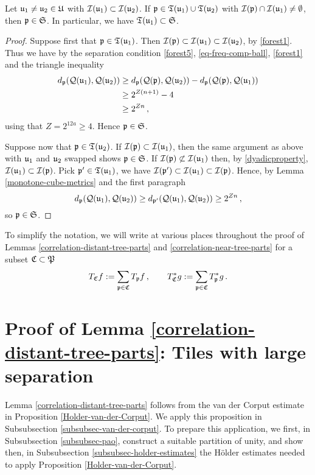 {\begin{lemma}
    \label{overlap-implies-distance}
    Let ${\mathfrak u}_1 \ne {\mathfrak u}_2 \in {\mathfrak U}$ with ${\mathcal{I}}({\mathfrak u}_1) \subset {\mathcal{I}}({\mathfrak u}_2)$. If ${\mathfrak p} \in {\mathfrak T}({\mathfrak u}_1) \cup {\mathfrak T}({\mathfrak u}_2)$ with ${\mathcal{I}}({\mathfrak p}) \cap {\mathcal{I}}({\mathfrak u}_1) \ne \emptyset$, then ${\mathfrak p} \in \mathfrak{S}$. In particular, we have ${\mathfrak T}({\mathfrak u}_1) \subset \mathfrak{S}$.
\end{lemma}

\begin{proof}
    Suppose first that ${\mathfrak p} \in {\mathfrak T}({\mathfrak u}_1)$. Then ${\mathcal{I}}({\mathfrak p}) \subset {\mathcal{I}}({\mathfrak u}_1) \subset {\mathcal{I}}({\mathfrak u}_2)$, by \eqref{forest1}. Thus we have by the separation condition \eqref{forest5}, \eqref{eq-freq-comp-ball}, \eqref{forest1} and the triangle inequality
    \begin{align*}
        d_{{\mathfrak p}}({\mathcal{Q}}({\mathfrak u}_1), {\mathcal{Q}}({\mathfrak u}_2)) &\ge d_{{\mathfrak p}}({\mathcal{Q}}({\mathfrak p}), {\mathcal{Q}}({\mathfrak u}_2)) - d_{{\mathfrak p}}({\mathcal{Q}}({\mathfrak p}), {\mathcal{Q}}({\mathfrak u}_1))\\
        &\ge 2^{Z(n+1)} - 4\\
        &\ge 2^{Zn}\,,
    \end{align*}
    using that $Z= 2^{12a}\ge 4$. Hence ${\mathfrak p} \in \mathfrak{S}$.

    Suppose now that ${\mathfrak p} \in {\mathfrak T}({\mathfrak u}_2)$. If ${\mathcal{I}}({\mathfrak p}) \subset {\mathcal{I}}({\mathfrak u}_1)$, then the same argument as above with ${\mathfrak u}_1$ and ${\mathfrak u}_2$ swapped shows ${\mathfrak p} \in \mathfrak{S}$. If ${\mathcal{I}}({\mathfrak p}) \not \subset {\mathcal{I}}({\mathfrak u}_1)$ then, by \eqref{dyadicproperty}, ${\mathcal{I}}({\mathfrak u}_1) \subset {\mathcal{I}}({\mathfrak p})$. Pick ${\mathfrak p}' \in {\mathfrak T}({\mathfrak u}_1)$, we have ${\mathcal{I}}({\mathfrak p}') \subset {\mathcal{I}}({\mathfrak u}_1) \subset {\mathcal{I}}({\mathfrak p})$. Hence, by Lemma \ref{monotone-cube-metrics} and the first paragraph
    $$
        d_{{\mathfrak p}}({\mathcal{Q}}({\mathfrak u}_1), {\mathcal{Q}}({\mathfrak u}_2)) \ge d_{{\mathfrak p}'}({\mathcal{Q}}({\mathfrak u}_1), {\mathcal{Q}}({\mathfrak u}_2)) \ge 2^{Zn}\,,
    $$
    so ${\mathfrak p} \in \mathfrak{S}$.
\end{proof}

To simplify the notation, we will write at various places throughout the proof of Lemmas \ref{correlation-distant-tree-parts} and \ref{correlation-near-tree-parts} for a subset ${\mathfrak C} \subset {\mathfrak P}$
$$
    T_{{\mathfrak C}} f := \sum_{{\mathfrak p} \in {\mathfrak C}} T_{{\mathfrak p}} f\,, \quad\quad T_{{\mathfrak C}}^* g := \sum_{{\mathfrak p}\in{\mathfrak C}} T_{{\mathfrak p}}^* g\,.
$$

\section{Proof of Lemma \ref{correlation-distant-tree-parts}: Tiles with large separation}
    \label{subsec-big-tiles}

Lemma \ref{correlation-distant-tree-parts} follows from the van der Corput estimate in Proposition \ref{Holder-van-der-Corput}. We apply this proposition in Subsubsection \ref{subsubsec-van-der-corput}. To prepare this application, we first, in Subsubsection \ref{subsubsec-pao}, construct a suitable partition of unity, and show then, in Subsubsection \ref{subsubsec-holder-estimates} the Hölder estimates needed to apply Proposition \ref{Holder-van-der-Corput}.

}
